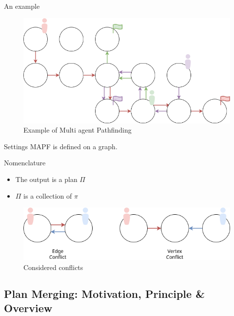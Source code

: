 \begin{frame}{An example}
    
    \begin{figure}[H]
        \centering
        \caption{Example of Multi agent Pathfinding}
        \includegraphics[width=\widthimg]{img/MAPF_example_2.drawio.png}
    \end{figure}

\end{frame}


\begin{frame}{Settings}
    MAPF is defined on a graph.
    
    \begin{block}{Nomenclature}
        \begin{itemize}
            \item The output is a plan \(\Pi\)
            \item \(\Pi\) is a collection of \(\pi\)
        \end{itemize}
    \end{block}
    
    
    \begin{figure}[H]
        \centering
        \caption{Considered conflicts}
        \includegraphics[width=\widthimg]{img/conflict_type.drawio.png}
    \end{figure}


\end{frame}



\subsection{Plan Merging: Motivation, Principle \& Overview}

